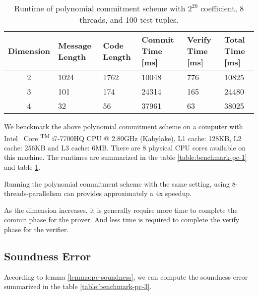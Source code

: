 \begin{table}[h!]
\centering
\begin{tabular}{| c | m{4em}  | m{3em}  | m{3.5em} | m{2.5em} | m{3em} |} 
 \hline
 Dimension & Message Length & Code Length & Commit Time [ms] & Verify Time [ms] & Total Time [ms] \\ [0.5ex] 
 \hline\hline
 2 & 1024   & 1762 & 10048 & 776 & 10825  \\
 \hline
 3 & 101    & 174 & 24314 & 165 & 24480 \\
 \hline
 4 & 32     & 56 & 37961 & 63 & 38025  \\ 
 \hline
\end{tabular}
\caption{Runtime of polynomial commitment scheme with $2^{20}$ coefficient, 8 threads, and 100 test tuples.}
\label{table:benchmark-pc-2}
\end{table}

We benckmark the above polynomial commitment scheme on a computer with
Intel \textregistered \, Core  \textsuperscript{TM} i7-7700HQ CPU @ 2.80GHz (Kabylake), L1 cache: 128KB, L2 cache: 256KB and L3 cache: 6MB. There are 8 physical CPU cores available on this machine. The runtimes are summarized in the table \ref{table:benchmark-pc-1} and table \ref{table:benchmark-pc-2}.


Running the polynomial commitment scheme with the same setting, using 8-threads-parallelism can provides approximately a 4x speedup.

As the dimension increases, it is generally require more time to complete the commit phase for the prover. And less time is required to complete the verify phase for the verifier.

\subsection{Soundness Error}

According to lemma \ref{lemma:pc-soundness}, we can compute the soundness error summarized in the table \ref{table:benchmark-pc-3}.

